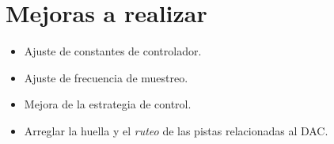 \section*{Mejoras a realizar}
\begin{itemize}
    \item Ajuste de constantes de controlador.
    \item Ajuste de frecuencia de muestreo.
    \item Mejora de la estrategia de control.
    \item Arreglar la huella y el \textit{ruteo} de las pistas relacionadas al DAC.
\end{itemize}

